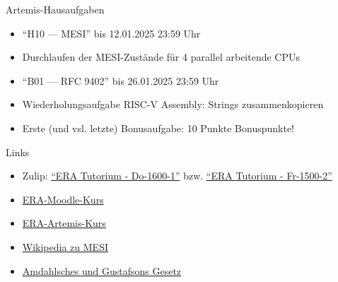 \begin{frame}[c, fragile]{Artemis-Hausaufgaben}{}
	\begin{itemize}
		\item \enquote{H10 --- MESI} bis 12.01.2025 23:59 Uhr
		\item Durchlaufen der MESI-Zustände für 4 parallel arbeitende CPUs
	\end{itemize}
	\vspace{1cm}
	\begin{itemize}
		\item \enquote{B01 --- RFC 9402} bis 26.01.2025 23:59 Uhr
		\item Wiederholungsaufgabe RISC-V Assembly: Strings zusammenkopieren
		\item Erste (und vsl. letzte) Bonusaufgabe: 10 Punkte Bonuspunkte!
	\end{itemize}
\end{frame}

\begin{frame}[c, fragile]{Links}{}
	\begin{itemize}
		\item Zulip: \href{https://zulip.in.tum.de/#narrow/stream/2661-ERA-Tutorium---Do-1600-1}{\enquote{ERA Tutorium - Do-1600-1}}
		      bzw. \href{https://zulip.in.tum.de/#narrow/stream/2675-ERA-Tutorium---Fr-1500-2 }{\enquote{ERA Tutorium - Fr-1500-2}}
		\item \href{https://www.moodle.tum.de/course/view.php?id=100633}{ERA-Moodle-Kurs}
		\item \href{https://artemis.in.tum.de/courses/401}{ERA-Artemis-Kurs}
		\item \href{https://de.wikipedia.org/wiki/MESI}{Wikipedia zu MESI}
		\item \href{https://www.educative.io/answers/difference-between-amdahls-and-gustafsons-laws}{Amdahlsches und Gustafsons Gesetz}
	\end{itemize}
\end{frame}

\maketitle


